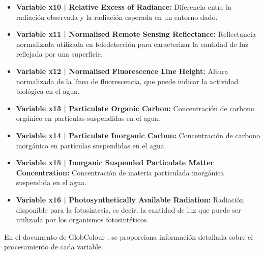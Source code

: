 \documentclass[twoside,11pt]{article}
\begin{document}
\begin{itemize}
    \item \textbf{Variable x10 | Relative Excess of Radiance:}
    Diferencia entre la radiación observada y la radiación esperada en un entorno dado.

    \item \textbf{Variable x11 | Normalised Remote Sensing Reflectance:}
    Reflectancia normalizada utilizada en teledetección para caracterizar la cantidad de luz reflejada por una superficie.

    \item \textbf{Variable x12 | Normalised Fluorescence Line Height:}
    Altura normalizada de la línea de fluorescencia, que puede indicar la actividad biológica en el agua.

    \item \textbf{Variable x13 | Particulate Organic Carbon:}
    Concentración de carbono orgánico en partículas suspendidas en el agua.

    \item \textbf{Variable x14 | Particulate Inorganic Carbon:}
    Concentración de carbono inorgánico en partículas suspendidas en el agua.

    \item \textbf{Variable x15 | Inorganic Suspended Particulate Matter Concentration:}
    Concentración de materia particulada inorgánica suspendida en el agua.

    \item \textbf{Variable x16 | Photosynthetically Available Radiation:}
    Radiación disponible para la fotosíntesis, es decir, la cantidad de luz que puede ser utilizada por los organismos fotosintéticos.
\end{itemize}

En el documento de GlobColour \cite{globcolour2020}, se proporciona información detallada sobre el procesamiento de cada variable.
\end{document}
